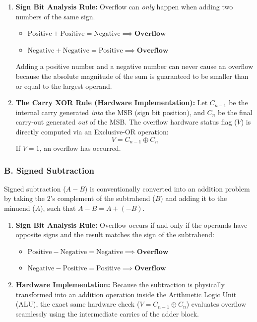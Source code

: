 \documentclass[12pt,a3paper]{article}
\begin{document}
\begin{enumerate}
\begin{tcolorbox}[enhanced,breakable,ansbox,colback=cD!4,colframe=cD,boxrule=0.8pt,arc=5pt,title={\textbf{Answer}},fonttitle=\bfseries\color{white},colbacktitle=cD]
\begin{enumerate}
    \item \textbf{Sign Bit Analysis Rule:} Overflow can \textit{only} happen when adding two numbers of the same sign. 
    \begin{itemize}
        \item $\text{Positive} + \text{Positive} = \text{Negative} \implies \textbf{Overflow}$
        \item $\text{Negative} + \text{Negative} = \text{Positive} \implies \textbf{Overflow}$
    \end{itemize}
    Adding a positive number and a negative number can never cause an overflow because the absolute magnitude of the sum is guaranteed to be smaller than or equal to the largest operand.
    
    \item \textbf{The Carry XOR Rule (Hardware Implementation):} Let $C_{n-1}$ be the internal carry generated \textit{into} the MSB (sign bit position), and $C_n$ be the final carry-out generated \textit{out} of the MSB. The overflow hardware status flag ($V$) is directly computed via an Exclusive-OR operation:
    $$V = C_{n-1} \oplus C_n$$
    If $V = 1$, an overflow has occurred.
\end{enumerate}

\subsubsection*{B. Signed Subtraction}
Signed subtraction ($A - B$) is conventionally converted into an addition problem by taking the 2's complement of the subtrahend ($B$) and adding it to the minuend ($A$), such that $A - B = A + (-B)$.

\begin{enumerate}
    \item \textbf{Sign Bit Analysis Rule:} Overflow occurs if and only if the operands have opposite signs and the result matches the sign of the subtrahend:
    \begin{itemize}
        \item $\text{Positive} - \text{Negative} = \text{Negative} \implies \textbf{Overflow}$
        \item $\text{Negative} - \text{Positive} = \text{Positive} \implies \textbf{Overflow}$
    \end{itemize}
    \item \textbf{Hardware Implementation:} Because the subtraction is physically transformed into an addition operation inside the Arithmetic Logic Unit (ALU), the exact same hardware check ($V = C_{n-1} \oplus C_n$) evaluates overflow seamlessly using the intermediate carries of the adder block.
\end{enumerate}


\end{tcolorbox}
\end{enumerate}
\end{document}
